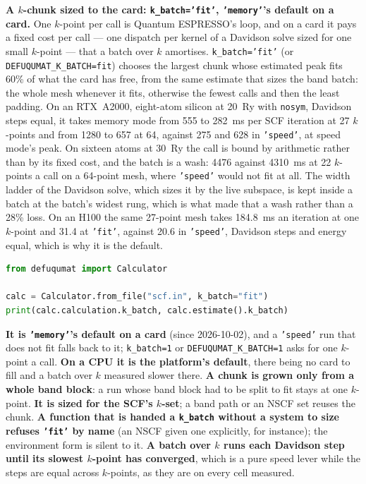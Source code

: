 \documentclass[11pt,a4paper]{article}
\newcommand{\qe}{Quantum ESPRESSO}
\newcommand{\code}[1]{\texttt{\small #1}}
\begin{document}
\textbf{A $k$-chunk sized to the card: \code{k\_batch='fit'}, \code{'memory'}'s
default on a card.} One $k$-point per call is \qe's loop, and on a card it pays a
fixed cost per call --- one dispatch per kernel of a Davidson solve sized for one small
$k$-point --- that a batch over $k$ amortises. \code{k\_batch='fit'} (or
\code{DEFUQUMAT\_K\_BATCH=fit}) chooses the largest chunk whose estimated peak fits
60\% of what the card has free, from the same estimate that sizes the band batch:
the whole mesh whenever it fits, otherwise the fewest calls and then the least
padding. On an RTX~A2000, eight-atom silicon at 20~Ry with \code{nosym}, Davidson
steps equal, it takes memory mode from 555 to 282~ms per SCF iteration at 27
$k$-points and from 1280 to 657 at 64, against 275 and 628 in \code{'speed'}, at
speed mode's peak. On sixteen atoms at 30~Ry the call is bound by arithmetic
rather than by its fixed cost, and the batch is a wash: 4476 against 4310~ms at
22 $k$-points a call on a 64-point mesh, where \code{'speed'} would not fit at all.
The width ladder of the Davidson solve, which sizes it by the live subspace, is
kept inside a batch at the batch's widest rung, which is what made that a wash
rather than a 28\% loss. On an H100 the same 27-point mesh takes 184.8~ms an
iteration at one $k$-point and 31.4 at \code{'fit'}, against 20.6 in
\code{'speed'}, Davidson steps and energy equal, which is why it is the default.

\begin{lstlisting}[language=Python]
from defuqumat import Calculator

calc = Calculator.from_file("scf.in", k_batch="fit")
print(calc.calculation.k_batch, calc.estimate().k_batch)
\end{lstlisting}

\begin{refuses}
\textbf{It is \code{'memory'}'s default on a card} (since 2026-10-02), and a
\code{'speed'} run that does not fit falls back to it; \code{k\_batch=1} or
\code{DEFUQUMAT\_K\_BATCH=1} asks for one $k$-point a call. \textbf{On a CPU it is
the platform's default}, there being no card to fill and a
batch over $k$ measured slower there. \textbf{A chunk is grown only from a whole
band block}: a run whose band block had to be split to fit stays at one $k$-point.
\textbf{It is sized for the SCF's $k$-set}; a band path or an NSCF set reuses the
chunk. \textbf{A function that is handed a \code{k\_batch} without a system to size
refuses \code{'fit'} by name} (an NSCF given one explicitly, for instance); the
environment form is silent to it. \textbf{A batch over $k$ runs each Davidson step
until its slowest $k$-point has converged}, which is a pure speed lever while the
steps are equal across $k$-points, as they are on every cell measured.
\end{refuses}
\end{document}
